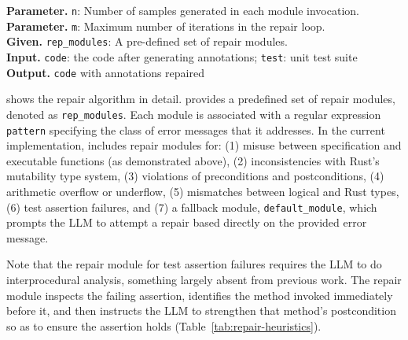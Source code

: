 \begin{small}
\begin{algorithm}[htbp]
\SetAlgoNoLine 
{}
\caption{The Repair Stage}
\label{fig:fixfunc}
\textbf{Parameter.} {\texttt{n}: Number of samples generated in each module invocation.}\\
\textbf{Parameter.} {\texttt{m}: Maximum number of iterations in the repair loop.}\\
\textbf{Given.} {\texttt{rep\_modules}: A pre-defined set of repair modules.}\\
\textbf{Input.} {\texttt{code}: the code after generating annotations; \texttt{test}: unit test suite}\\
\textbf{Output.} {\texttt{code} with annotations repaired}\\
\end{algorithm}
\end{small}

 shows the repair algorithm in detail.  \toolname{} provides a predefined set of repair modules, denoted as \texttt{rep\_modules}. Each module is associated with a regular expression \texttt{pattern} specifying the class of error messages that it addresses. In the current implementation, \toolname{} includes repair modules for: (1) misuse between specification and executable functions (as demonstrated above), (2) inconsistencies with Rust’s mutability type system, (3) violations of preconditions and postconditions, (4) arithmetic overflow or underflow, (5) mismatches between logical and Rust types, (6) test assertion failures, and (7) a fallback module, \texttt{default\_module}, which prompts the LLM to attempt a repair based directly on the provided error message.

Note that the repair module for test assertion failures requires the LLM to do interprocedural analysis, something largely absent from previous work.  The repair module inspects the failing assertion, identifies the method invoked immediately before it, and then instructs the LLM to strengthen that method's postcondition so as to ensure the assertion holds\ifarxiv{} (Table~\ref{tab:repair-heuristics})\fi.

